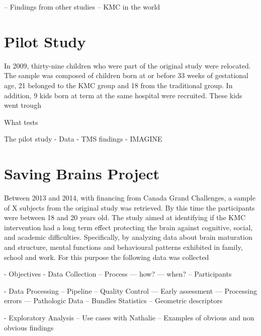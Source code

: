 
-- Findings from other studies
-- KMC in the world

\section{Pilot Study}

In 2009, thirty-nine children who were part of the original study were relocated. The sample was composed of children born at or before 33 weeks of gestational age, 21 belonged to the KMC group and 18 from the traditional group. In addition, 9 kids born at term at the same hospital were recruited. These kids went trough

What tests



The pilot study
 - Data
 - TMS findings
 - IMAGINE


\section{Saving Brains Project}


Between 2013 and 2014, with financing from Canada Grand Challenges, a sample of X subjects from the original study was retrieved. By this time the participants were between 18 and 20 years old. The study aimed at identifying if the KMC intervention had a long term effect protecting the brain against cognitive, social, and academic difficulties. Specifically, by analyzing data about  brain maturation and structure, mental functions and behavioural patterns exhibited in family, school and work. For this purpose the following data was collected





 - Objectives
 - Data Collection
 -- Process
 --- how?
 --- when?
 -- Participants

 
 - Data Processing
 -- Pipeline
 -- Quality Control
 --- Early assessment
 --- Processing errors
 --- Pathologic Data
 -- Bundles Statistics
 -- Geometric descriptors

 - Exploratory Analysis
 -- Use cases with Nathalie
 -- Examples of obvious and non obvious findings



